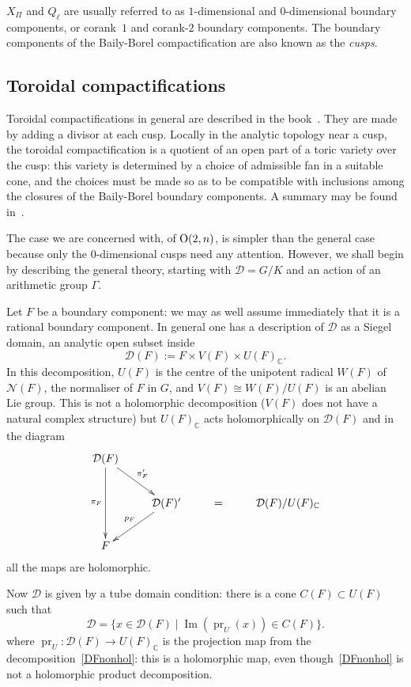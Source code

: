 \documentclass[a4paper,11pt]{article}
\newcommand{\CC}{\mathbb C}
\renewcommand{\cD}{\mathcal D}
\newcommand{\cN}{\mathcal N}
\newcommand{\imic}{\cong}
\newcommand{\Orth}{\mathop{\null\mathrm {O}}\nolimits}
\renewcommand{\Im}{\mathop{\mathrm {Im}}\nolimits}
\newcommand{\pr}{\mathop{\mathrm {pr}}\nolimits}
\begin{document}
$X_\Pi$ and $Q_\ell$ are usually referred to as $1$-dimensional and
$0$-dimensional boundary components, or corank~$1$ and corank-$2$
boundary components. The boundary components of the Baily-Borel
compactification are also known as the \emph{cusps}.

\subsection{Toroidal compactifications}\label{subsect:toroidal}

Toroidal compactifications in general are described in the
book~\cite{AMRT}. They are made by adding a divisor at each cusp.
Locally in the analytic topology near a cusp, the toroidal
compactification is a quotient of an open part of a toric variety over
the cusp: this variety is determined by a choice of admissible fan in
a suitable cone, and the choices must be made so as to be compatible
with inclusions among the closures of the Baily-Borel boundary
components. A summary may be found in~\cite[Chapter~III, \S5]{AMRT}.

The case we are concerned with,
of $\Orth(2,n)$, is simpler than the general case because only the
$0$-dimensional cusps need any attention. However, we shall begin by
describing the general theory, starting with $\cD=G/K$ and an action
of an arithmetic group $\Gamma$.

Let $F$ be a boundary component: we may as well assume immediately
that it is a rational boundary component. In general one has a
description of $\cD$ as a Siegel domain, an analytic open subset inside
\begin{equation}\label{DFnonhol}
\cD(F):=F\times V(F)\times U(F)_\CC.
\end{equation}
In this decomposition, $U(F)$ is the centre of the unipotent radical
$W(F)$ of $\cN(F)$, the normaliser of $F$ in $G$, and $V(F)\imic
W(F)/U(F)$ is an abelian Lie group.  This is not a holomorphic
decomposition ($V(F)$ does not have a natural complex structure) but
$U(F)_\CC$ acts holomorphically on $\cD(F)$ and in the diagram
\begin{equation*}
\xymatrix{
\cD(F) \ar[dd]_{\pi_F} \ar[dr]^{\pi'_F}\\
&\cD(F)' \ar[dl]_{p_F}&=&\cD(F)/U(F)_{\CC}\\
F
}
\end{equation*}
all the maps are holomorphic.

Now $\cD$ is given by a tube domain condition: there is a cone
$C(F)\subset U(F)$ such that
\begin{equation}\label{Dtube}
\cD=\{x \in \cD(F)\mid \Im(\pr_U(x))\in C(F)\}.
\end{equation}
where $\pr_U\colon \cD(F)\to U(F)_\CC$ is the projection map from the
decomposition~\eqref{DFnonhol}: this is a holomorphic map, even
though~\eqref{DFnonhol} is not a holomorphic product decomposition.
\end{document}
